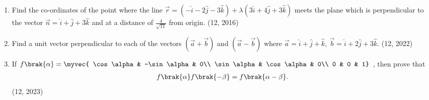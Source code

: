 \begin{enumerate}[label=\thesubsection.\arabic*,ref=\thesubsection.\theenumi]
\item Find the co-ordinates of the point where the line $\overrightarrow{r}=(-\hat{i}-2\hat{j}-3\hat{k})+\lambda(3\hat{i} +4\hat{j}+3\hat{k})$ meets the plane which is perpendicular to the vector $\overrightarrow{n}=\hat{i}+\hat{j} +3\hat{k}$ and at a distance of
      $\frac{4}{\sqrt{11}}$ from origin. \hfill (12, 2016)
\item Find a unit vector perpendicular to each of the vectors $(\vec{a}+\vec{b})$ and $(\vec{a}-\vec{b})$ where 
	$\vec{a}=\hat{i}+\hat{j}+\hat{k},\
	\vec{b}=\hat{i}+2\hat{j}+3\hat{k}$.
\hfill (12, 2022)
\item If $f\brak{\alpha}=\myvec{
    \cos\alpha & -\sin\alpha & 0\\
    \sin\alpha & \cos\alpha & 0\\
    0 & 0 & 1}$
 , then prove that\begin{align*}
      f\brak{\alpha}f\brak{-\beta} =f\brak{\alpha - \beta}.
 \end{align*}
\hfill (12, 2023)
\end{enumerate}
